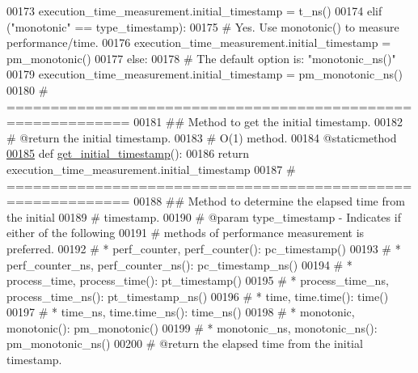 \begin{DoxyCode}
00173             execution\_time\_measurement.initial\_timestamp = t\_ns()
00174         \textcolor{keywordflow}{elif} (\textcolor{stringliteral}{"monotonic"} == type\_timestamp):
00175             \textcolor{comment}{# Yes. Use monotonic() to measure performance/time.}
00176             execution\_time\_measurement.initial\_timestamp = pm\_monotonic()
00177         \textcolor{keywordflow}{else}:
00178             \textcolor{comment}{# The default option is: "monotonic\_ns()"}
00179             execution\_time\_measurement.initial\_timestamp = pm\_monotonic\_ns()
00180     \textcolor{comment}{# ============================================================}
00181     \textcolor{comment}{##  Method to get the initial timestamp.}
00182     \textcolor{comment}{#   @return the initial timestamp.}
00183     \textcolor{comment}{#   O(1) method.}
00184     @staticmethod
\hypertarget{performance__measurement_8py_source_l00185}{}\hyperlink{classutilities_1_1timing__measurements_1_1performance__measurement_1_1execution__time__measurement_a8737db6c2fdb833d0d30d80c70ffebb0}{00185}     \textcolor{keyword}{def }\hyperlink{classutilities_1_1timing__measurements_1_1performance__measurement_1_1execution__time__measurement_a8737db6c2fdb833d0d30d80c70ffebb0}{get\_initial\_timestamp}():
00186         \textcolor{keywordflow}{return} execution\_time\_measurement.initial\_timestamp
00187     \textcolor{comment}{# ============================================================}
00188     \textcolor{comment}{##  Method to determine the elapsed time from the initial}
00189     \textcolor{comment}{#       timestamp.}
00190     \textcolor{comment}{#   @param type\_timestamp - Indicates if either of the following}
00191     \textcolor{comment}{#               methods of performance measurement is preferred.}
00192     \textcolor{comment}{#               * perf\_counter, perf\_counter(): pc\_timestamp()}
00193     \textcolor{comment}{#               * perf\_counter\_ns, perf\_counter\_ns(): pc\_timestamp\_ns()}
00194     \textcolor{comment}{#               * process\_time, process\_time(): pt\_timestamp()}
00195     \textcolor{comment}{#               * process\_time\_ns, process\_time\_ns(): pt\_timestamp\_ns()}
00196     \textcolor{comment}{#               * time, time.time(): time()}
00197     \textcolor{comment}{#               * time\_ns, time.time\_ns(): time\_ns()}
00198     \textcolor{comment}{#               * monotonic, monotonic(): pm\_monotonic()}
00199     \textcolor{comment}{#               * monotonic\_ns, monotonic\_ns(): pm\_monotonic\_ns()}
00200     \textcolor{comment}{#   @return the elapsed time from the initial timestamp.}

\end{DoxyCode}
